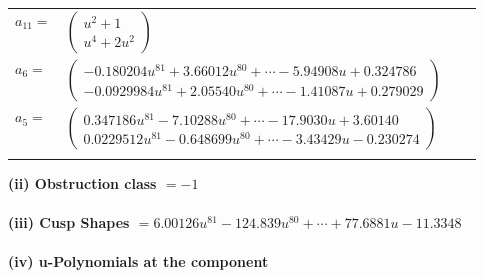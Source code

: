 \documentclass[1p]{elsarticle_modified}
\theoremstyle{definition}
\begin{document}
\begin{tabular}{m{7pt} m{180pt} m{7pt} m{180pt} }
\flushright $a_{11}=$&$\begin{pmatrix}u^2+1\\u^4+2 u^2\end{pmatrix}$ \\
\flushright $a_{6}=$&$\begin{pmatrix}-0.180204 u^{81}+3.66012 u^{80}+\cdots-5.94908 u+0.324786\\-0.0929984 u^{81}+2.05540 u^{80}+\cdots-1.41087 u+0.279029\end{pmatrix}$ \\
\flushright $a_{5}=$&$\begin{pmatrix}0.347186 u^{81}-7.10288 u^{80}+\cdots-17.9030 u+3.60140\\0.0229512 u^{81}-0.648699 u^{80}+\cdots-3.43429 u-0.230274\end{pmatrix}$\\&\end{tabular}
\flushleft \textbf{(ii) Obstruction class $= -1$}\\~\\
\flushleft \textbf{(iii) Cusp Shapes $= 6.00126 u^{81}-124.839 u^{80}+\cdots+77.6881 u-11.3348$}\\~\\
\newpage\renewcommand{\arraystretch}{1}
\flushleft \textbf{(iv) u-Polynomials at the component}\newline \\
\end{document}
